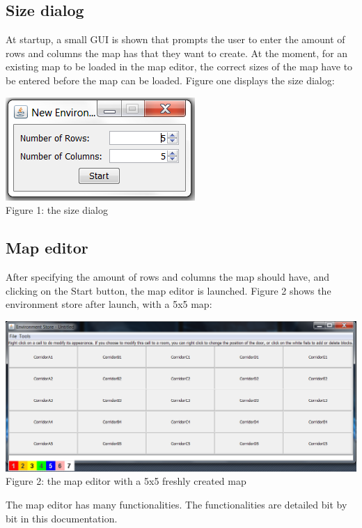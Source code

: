\subsection{Size dialog}
At startup, a small GUI is shown that prompts the user to enter the amount of rows and columns the map has that they want to create. At the moment, for an existing map to be loaded in the map editor, the correct sizes of the map have to be entered before the map can be loaded. Figure one displays the size dialog:
\begin{center}
	\centering
	\includegraphics{EnvironmentStore/SizeDialog.png}\\
	Figure 1: the size dialog
\end{center}
\subsection{Map editor}
After specifying the amount of rows and columns the map should have, and clicking on the Start button, the map editor is launched. Figure 2 shows the environment store after launch, with a 5x5 map:
\begin{center}
	\centering
	\includegraphics[scale=0.55]{EnvironmentStore/MapEditor.png}\\
	Figure 2: the map editor with a 5x5 freshly created map
\end{center}
The map editor has many functionalities. The functionalities are detailed bit by bit in this documentation.
